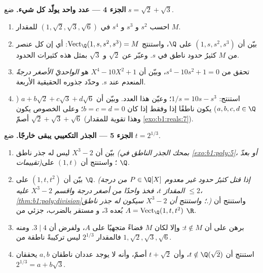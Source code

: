 \begin{problem}
\medskip
\noindent\textbf{الجزء 4 --- عدد واحد يولّد كل شيء.}
ضع $s = \sqrt2 + \sqrt3$.
\begin{enumerate}[resume]
  \item احسب  $s^2$ و $s^3$ و $s^4$ في
         $(1, \sqrt2, \sqrt3, \sqrt6)$ للمقدار $M$.
  \item بيّن أن $(1, s, s^2, s^3)$  على $\Q$، واستنتج
        $\operatorname{Vect}_\Q(1, s, s^2, s^3) = M$: أي إن كل
        عنصر من $M$ كثيرُ حدود ناطق في $s$. وعبّر عن
        $\sqrt2$ و $\sqrt3$ بمثل هذه كثيرات الحدود.
  \item تحقق من $s^4 - 10s^2 + 1 = 0$، وبيّن أن $X^4 - 10X^2
        + 1$ هو \emph{ الواحديّ الأصغر درجةً}
        المنعدم عند $s$. وحدّد جذوره الحقيقية الأربعة.
  \item استنتج: $1/s = 10s - s^3$؛ وعيّن هذا العدد. وبيّن
        أن $a + b\sqrt2 + c\sqrt3 + d\sqrt6$ ($a,b,c,d \in \Q$)
        يكون ناطقًا إذا وفقط إذا كان $b = c = d = 0$؛ وعلى
        الخصوص يكون $\sqrt2 + \sqrt3 + \sqrt6$ أصمّ
        (وهذا تقوية للمقدار \cref{exo:b1:reals:7}).
\end{enumerate}

\medskip
\noindent\textbf{الجزء 5 --- الجذر التكعيبي يبقى خارجًا.} ضع $t
= 2^{1/3}$.
\begin{enumerate}[resume]
  \item بيّن أن $X^3 - 2$ ليس له جذر ناطق \emph{(بمحك
        الجذر الناطق في \cref{exo:b1:poly:5}، أو بعدّ
        تقييمات)}؛ واستنتج أن $(1, t)$  على
        $\Q$.
  \item بيّن أن $(1, t, t^2)$  على $\Q$. \emph{(إذا قتل
        كثيرُ حدود غير معدوم $P \in \Q[X]$ من درجة $\leq 2$ المقدارَ $t$، فخذ
        واحدًا من أصغر درجة واقسم $X^3 - 2$ عليه،
        \cref{thm:b1:poly:division}؛ واستنتج أن $X^3 - 2$
        سيكون له جذر ناطق.)} واستنتج أن $A =
        \operatorname{Vect}_\Q(1, t, t^2)$ بُعده $3$، و
        مستقر بالضرب،  جزئي من $\R$.
  \item برهن على أن $t \notin M$: وإلا لكان $M$ فضاءً متجهيًا
        على  $A$، ولفرض  أن $3 \mid 4$.
        ومنه فالمقدار $2^{1/3}$ ليس تركيبةً ناطقة
        من $1, \sqrt2, \sqrt3, \sqrt6$.
  \item استنتج أن $t \notin \Q(\sqrt2)$، وأن $t + \sqrt2$
        أصمّ، وأنه لا يوجد عددان ناطقان $a, b$ يحققان
        $2^{1/3} = a + b\sqrt3$.
\end{enumerate}


\end{problem}
